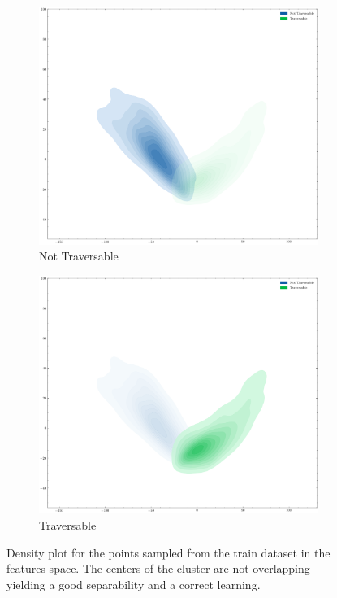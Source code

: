 \documentclass[../document.tex]{subfiles}
\begin{document}
\begin{figure}[H]
    \begin{subfigure}[b]{0.48\textwidth}
        \includegraphics[width=\linewidth]{../img/5/pca/pca-0-density.png}
        \caption{Not Traversable}
    \end{subfigure}
    \begin{subfigure}[b]{0.48\textwidth}
        \includegraphics[width=\linewidth]{../img/5/pca/pca-1-density.png}
        \caption{Traversable}
    \end{subfigure}
    \caption{Density plot for the points sampled from the train dataset in the features space. The centers of the cluster are not overlapping yielding a good separability and a correct learning.}
    \end{figure}
\end{document}
